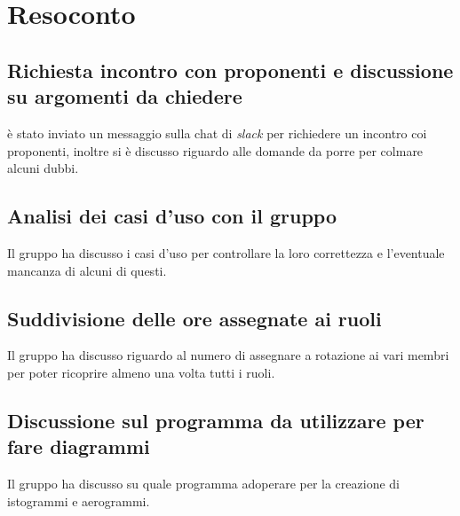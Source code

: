 \documentclass[a4paper]{article}
\begin{document}
    \section{Resoconto}
    
        \subsection{Richiesta incontro con proponenti e discussione su argomenti da chiedere}
        è stato inviato un messaggio sulla chat di \textit{slack} per richiedere un incontro coi proponenti, inoltre si è discusso riguardo alle domande da porre per colmare alcuni dubbi.
        
        \subsection{Analisi dei casi d'uso con il gruppo}
        Il gruppo ha discusso i casi d'uso per controllare la loro correttezza e l'eventuale mancanza di alcuni di questi.

        \subsection{Suddivisione delle ore assegnate ai ruoli}
        Il gruppo ha discusso riguardo al numero di assegnare a rotazione ai vari membri per poter ricoprire almeno una volta tutti i ruoli.

        \subsection{Discussione sul programma da utilizzare per fare diagrammi}
        Il gruppo ha discusso su quale programma adoperare per la creazione di istogrammi e aerogrammi.
\end{document}

